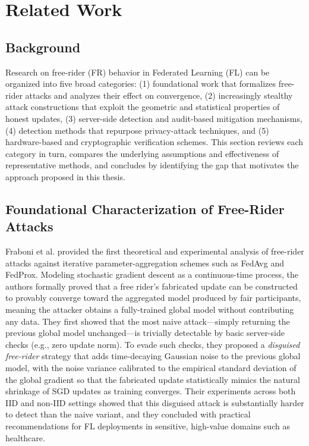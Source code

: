 \chapter{Related Work}
\label{sec:related-work}

\section{Background}
Research on free-rider (FR) behavior in Federated Learning (FL) can be organized into five broad categories: (1) foundational work that formalizes free-rider attacks and analyzes their effect on convergence, (2) increasingly stealthy attack constructions that exploit the geometric and statistical properties of honest updates, (3) server-side detection and audit-based mitigation mechanisms, (4) detection methods that repurpose privacy-attack techniques, and (5) hardware-based and cryptographic verification schemes. This section reviews each category in turn, compares the underlying assumptions and effectiveness of representative methods, and concludes by identifying the gap that motivates the approach proposed in this thesis.

\section{Foundational Characterization of Free-Rider Attacks}
\label{subsec:foundational}

Fraboni et al. \cite{fraboni2021freerider} provided the first theoretical and experimental analysis of free-rider attacks against iterative parameter-aggregation schemes such as FedAvg and FedProx. Modeling stochastic gradient descent as a continuous-time process, the authors formally proved that a free rider's fabricated update can be constructed to provably converge toward the aggregated model produced by fair participants, meaning the attacker obtains a fully-trained global model without contributing any data. They first showed that the most naive attack—simply returning the previous global model unchanged—is trivially detectable by basic server-side checks (e.g., zero update norm). To evade such checks, they proposed a \emph{disguised free-rider} strategy that adds time-decaying Gaussian noise to the previous global model, with the noise variance calibrated to the empirical standard deviation of the global gradient so that the fabricated update statistically mimics the natural shrinkage of SGD updates as training converges. Their experiments across both IID and non-IID settings showed that this disguised attack is substantially harder to detect than the naive variant, and they concluded with practical recommendations for FL deployments in sensitive, high-value domains such as healthcare.

